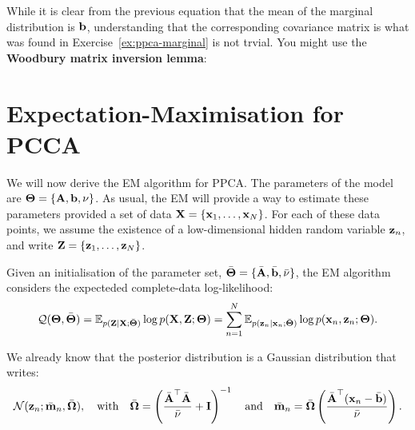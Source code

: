 While it is clear from the previous equation that the mean of the marginal distribution is $\boldsymbol{\mathbf{b}}$, understanding that the corresponding covariance matrix is what was found in Exercise~\ref{ex:ppca-marginal} is not trvial. You might use the \textbf{Woodbury matrix inversion lemma}:\vspace{3mm}

\vspace{3mm}


\section{Expectation-Maximisation for PCCA}

We will now derive the EM algorithm for PPCA. The parameters of the model are $\boldsymbol{\mathbf{\Theta}}=\{\boldsymbol{\mathbf{A}},\boldsymbol{\mathbf{b}},\nu\}$. As usual, the EM will provide a way to estimate these parameters provided a set of data $\boldsymbol{\mathbf{X}}=\{\boldsymbol{\mathbf{x}}_1,\ldots,\boldsymbol{\mathbf{x}}_N\}$. For each of these data points, we assume the existence of a low-dimensional hidden random variable $\boldsymbol{\mathbf{z}}_n$, and write $\boldsymbol{\mathbf{Z}}=\{\boldsymbol{\mathbf{z}}_1,\ldots,\boldsymbol{\mathbf{z}}_N\}$. \vspace{3mm}

Given an initialisation of the parameter set, $\bar{\boldsymbol{\mathbf{\Theta}}}=\{\bar{\boldsymbol{\mathbf{A}}},\bar{\boldsymbol{\mathbf{b}}},\bar{\nu}\}$, the EM algorithm considers the expecteded complete-data log-likelihood:
\begin{equation}
 \mathcal{Q}(\boldsymbol{\mathbf{\Theta}},\bar{\boldsymbol{\mathbf{\Theta}}}) =\mathbb{E}_{p(\boldsymbol{\mathbf{Z}}|\boldsymbol{\mathbf{X}};\bar{\boldsymbol{\mathbf{\Theta}}})} \log p(\boldsymbol{\mathbf{X}},\boldsymbol{\mathbf{Z}};\boldsymbol{\mathbf{\Theta}})  = \sum_{n=1}^N \mathbb{E}_{p(\boldsymbol{\mathbf{z}}_n|\boldsymbol{\mathbf{x}}_n;\bar{\boldsymbol{\mathbf{\Theta}}})} \log p(\boldsymbol{\mathbf{x}}_n,\boldsymbol{\mathbf{z}}_n;\boldsymbol{\mathbf{\Theta}}).
\end{equation}

We already know that the posterior distribution is a Gaussian distribution that writes:
\begin{equation}
\mathcal{N}(\boldsymbol{\mathbf{z}}_n;\bar{\boldsymbol{\mathbf{m}}}_n,\bar{\boldsymbol{\mathbf{\Omega}}}),
\quad\text{with}\quad  \bar{\boldsymbol{\mathbf{\Omega}}} = \left(\frac{\bar{\boldsymbol{\mathbf{A}}}^\top\bar{\boldsymbol{\mathbf{A}}}}{\bar{\nu}}+\boldsymbol{\mathbf{I}}\right)^{-1} \quad\text{and}\quad \bar{\boldsymbol{\mathbf{m}}}_n=\bar{\boldsymbol{\mathbf{\Omega}}}\left(\frac{\bar{\boldsymbol{\mathbf{A}}}^\top(\boldsymbol{\mathbf{x}}_n-\bar{\boldsymbol{\mathbf{b}}})}{\bar{\nu}}\right) .
\end{equation}

